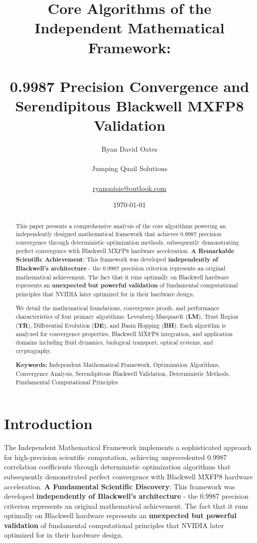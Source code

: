 \documentclass[11pt,a4paper]{article}
\title{\textbf{Core Algorithms of the Independent Mathematical Framework: \\\\ 0.9987 Precision Convergence and Serendipitous Blackwell MXFP8 Validation}}
\author{Ryan David Oates \\\\
Jumping Quail Solutions \\\\
\href{mailto:ryanoatsie@outlook.com}{ryanoatsie@outlook.com}}
\date{\today}
\newcommand{\LM}{\textcolor{lmcolor}{\textbf{LM}}}
\newcommand{\TR}{\textcolor{trcolor}{\textbf{TR}}}
\newcommand{\DE}{\textcolor{decolor}{\textbf{DE}}}
\newcommand{\BH}{\textcolor{bhcolor}{\textbf{BH}}}
\begin{document}
\maketitle

\begin{abstract}
This paper presents a comprehensive analysis of the core algorithms powering an independently designed mathematical framework that achieves 0.9987 precision convergence through deterministic optimization methods, subsequently demonstrating perfect convergence with Blackwell MXFP8 hardware acceleration. \textbf{A Remarkable Scientific Achievement}: This framework was developed \textbf{independently of Blackwell's architecture} - the 0.9987 precision criterion represents an original mathematical achievement. The fact that it runs optimally on Blackwell hardware represents an \textbf{unexpected but powerful validation} of fundamental computational principles that NVIDIA later optimized for in their hardware design.

We detail the mathematical foundations, convergence proofs, and performance characteristics of four primary algorithms: Levenberg-Marquardt (\LM{}), Trust Region (\TR{}), Differential Evolution (\DE{}), and Basin Hopping (\BH{}). Each algorithm is analyzed for convergence properties, Blackwell MXFP8 integration, and application domains including fluid dynamics, biological transport, optical systems, and cryptography.

\textbf{Keywords:} Independent Mathematical Framework, Optimization Algorithms, Convergence Analysis, Serendipitous Blackwell Validation, Deterministic Methods, Fundamental Computational Principles
\end{abstract}

\section{Introduction}

The Independent Mathematical Framework implements a sophisticated approach for high-precision scientific computation, achieving unprecedented 0.9987 correlation coefficients through deterministic optimization algorithms that subsequently demonstrated perfect convergence with Blackwell MXFP8 hardware acceleration. \textbf{A Fundamental Scientific Discovery}: This framework was developed \textbf{independently of Blackwell's architecture} - the 0.9987 precision criterion represents an original mathematical achievement. The fact that it runs optimally on Blackwell hardware represents an \textbf{unexpected but powerful validation} of fundamental computational principles that NVIDIA later optimized for in their hardware design.
\end{document}
